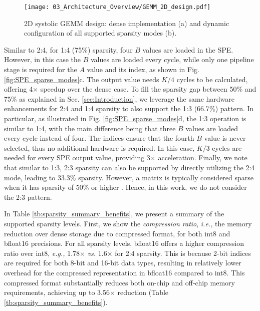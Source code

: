 \begin{figure*}[ht]

\vspace{-0.55cm}

\centering
\texttt{[image: 03\_Architecture\_Overview/GEMM\_2D\_design.pdf]}

\vspace{-0.35cm}

\caption{2D systolic GEMM design: dense implementation (a) and dynamic configuration of all supported sparsity modes (b).}
\label{fig:GEMM_2D_array_SSTs}

\vspace{-0.45cm}

\end{figure*}


Similar to 2:4, for 1:4 (75\%) sparsity, four $B$ values are loaded in the SPE.
However, in this case the $B$ values are loaded every cycle, while only one pipeline stage is required for the $A$ value and its index, as shown in Fig. \ref{fig:SPE_sparse_modes}c.
The output value needs $K/4$ cycles to be calculated, offering 4$\times$ speedup over the dense case.
To fill the sparsity gap between 50\% and 75\% as explained in Sec. \ref{sec:Introduction}, we leverage the same hardware enhancements for 2:4 and 1:4 sparsity to also support the 1:3 (66.7\%) pattern.
In particular, as illustrated in Fig. \ref{fig:SPE_sparse_modes}d, the 1:3 operation is similar to 1:4, with the main difference being that three $B$ values are loaded every cycle instead of four.
The indices ensure that the fourth $B$ value is never selected, thus no additional hardware is required.
In this case, $K/3$ cycles are needed for every SPE output value, providing 3$\times$ acceleration.
Finally, we note that similar to 1:3, 2:3 sparsity can also be supported by directly utilizing the 2:4 mode, leading to 33.3\% sparsity.
However, a matrix is typically considered sparse when it has sparsity of 50\% or higher \cite{AMD_AIE_ML_kernel_guide}.
Hence, in this work, we do not consider the 2:3 pattern. 







In Table \ref{tb:sparsity_summary_benefits}, we present a summary of the supported sparsity levels.
First, we show the \textit{compression ratio}, \emph{i.e.,} the memory reduction over dense storage due to compressed format, for both int8 and bfloat16 precisions.
For all sparsity levels, bfloat16 offers a higher compression ratio over int8, \emph{e.g.,} 1.78$\times$ \emph{vs.} 1.6$\times$ for 2:4 sparsity. 
This is because 2-bit indices are required for both 8-bit and 16-bit data types, resulting in relatively lower overhead for the compressed representation in bfloat16 compared to int8.
This compressed format substantially reduces both on-chip and off-chip memory requirements, achieving up to 3.56$\times$ reduction (Table \ref{tb:sparsity_summary_benefits}).


